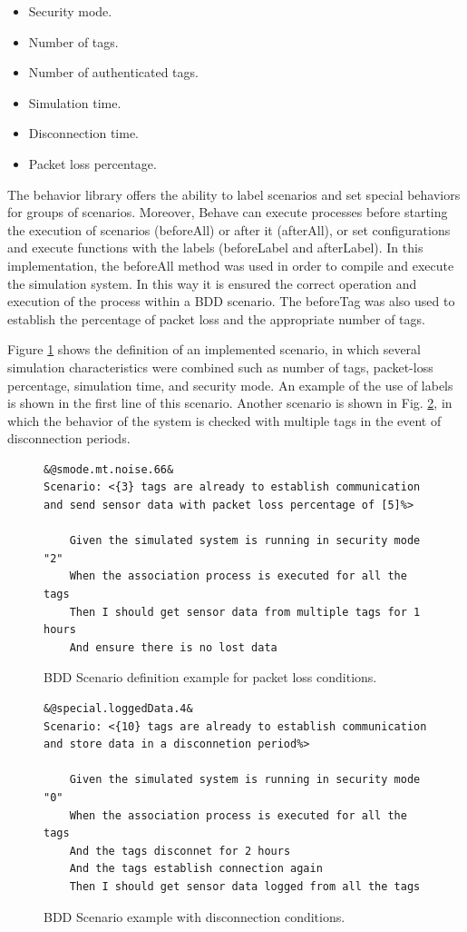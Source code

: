 \documentclass[journal]{IEEEtran}	%
\begin{document}
\begin{itemize}
    \item Security mode.
    \item Number of tags.
    \item Number of authenticated tags.
    \item Simulation time.
    \item Disconnection time.
    \item Packet loss percentage.
\end{itemize}

The behavior library offers the ability to label scenarios and set special behaviors for groups of scenarios. Moreover, Behave can execute processes before starting the execution of scenarios (beforeAll) or after it (afterAll), or set configurations and execute functions with the labels (beforeLabel and afterLabel). In this implementation, the beforeAll method was used in order to compile and execute the simulation system. In this way it is ensured the correct operation and execution of the process within a BDD scenario. The beforeTag was also used to establish the percentage of packet loss and the appropriate number of tags.

Figure \ref{fig:bddScenario1} shows the definition of an implemented scenario, in which several simulation characteristics were combined such as number of tags, packet-loss percentage, simulation time, and security mode. An example of the use of labels is shown in the first line of this scenario. Another scenario is shown in Fig. \ref{fig:bddScenario2}, in which the behavior of the system is checked with multiple tags in the event of disconnection periods.

\begin{figure}[t!]
\centering
\begin{lstlisting}[style=scenarioStyle]
&@smode.mt.noise.66&
Scenario: <{3} tags are already to establish communication and send sensor data with packet loss percentage of [5]%>
    
    Given the simulated system is running in security mode "2"
    When the association process is executed for all the tags
    Then I should get sensor data from multiple tags for 1 hours
    And ensure there is no lost data
\end{lstlisting}
\caption{BDD Scenario definition example for packet loss conditions.}
\label{fig:bddScenario1}
\end{figure}

\begin{figure}[t!]
\centering
\begin{lstlisting}[style=scenarioStyle]
&@special.loggedData.4&
Scenario: <{10} tags are already to establish communication and store data in a disconnetion period%>
    
    Given the simulated system is running in security mode "0"
    When the association process is executed for all the tags
    And the tags disconnet for 2 hours
    And the tags establish connection again
    Then I should get sensor data logged from all the tags
\end{lstlisting}
\caption{BDD Scenario example with disconnection conditions.}
\label{fig:bddScenario2}
\end{figure}
\end{document}

